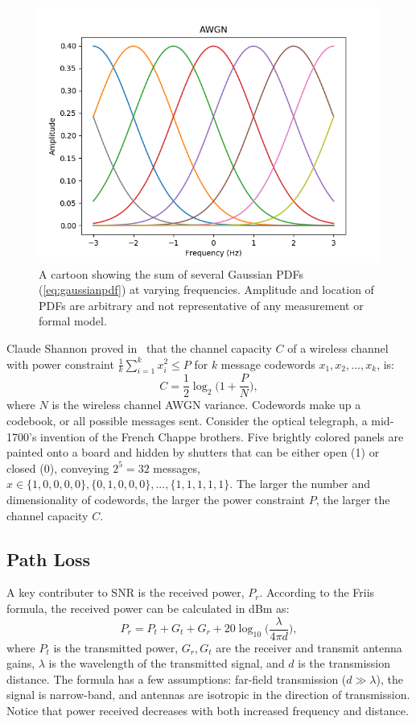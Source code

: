 \begin{figure}[ht!]
	\centering	\includegraphics[width=1\textwidth,keepaspectratio]{figs/awgn.png}
    \caption{A cartoon showing the sum of several Gaussian PDFs (\ref{eq:gaussianpdf}) at varying frequencies. Amplitude and location of PDFs are arbitrary and not representative of any measurement or formal model.} 
\label{fig:awgn}      
\end{figure}

Claude Shannon proved in~\cite{Shannon} that the channel capacity $C$ of a wireless channel with power constraint $\frac{1}{k}\sum_{i=1}^k x_i^2 \leq P$ for $k$ message codewords $x_1, x_2,...,x_k$, is:
\begin{equation}
\label{eq:capacity}
C = \frac{1}{2} \log_2 \bigg(1+\frac{P}{N}\bigg),
\end{equation}
where $N$ is the wireless channel AWGN variance. Codewords make up a codebook, or all possible messages sent. Consider the optical telegraph, a mid-1700's invention of the French Chappe brothers. Five brightly colored panels are painted onto a board and hidden by shutters that can be either open (1) or closed (0), conveying $2^5=32$ messages, $x \in \{1,0,0,0,0 \}, \{0,1,0,0,0 \},...,\{1,1,1,1,1 \}$. The larger the number and dimensionality of codewords, the larger the power constraint $P$, the larger the channel capacity $C$. 

\subsection{Path Loss}
\label{pathloss}
A key contributer to SNR is the received power, $P_r$. According to the Friis formula, the received power can be calculated in dBm as:
\begin{equation}
\label{eq:friis}
P_r = P_t + G_t + G_r + 20\log_{10}\bigg(\frac{\lambda}{4\pi d}  \bigg),
\end{equation}
where $P_t$ is the transmitted power, $G_r, G_t$ are the receiver and transmit antenna gains, $\lambda$ is the wavelength of the transmitted signal, and $d$ is the transmission distance. The formula has a few assumptions: far-field transmission ($d \gg \lambda$), the signal is narrow-band, and antennas are isotropic in the direction of transmission. Notice that power received decreases with both increased frequency and distance.

